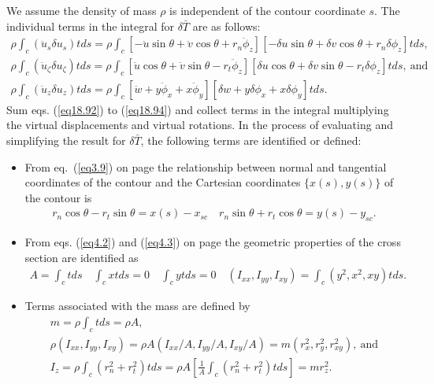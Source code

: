 \documentclass{AeroStructure-ERJohnson}
\begin{document}
We assume the density of mass $\rho$ is independent of the contour coordinate $s$. The individual terms in the integral for $\delta \bar{T}$ are as follows:
\begin{gather}\label{eq18.92}
\rho \int_{c}\left(\ddot{u}_{s} \delta u_{s}\right) t d s=\rho \int_{c}\left[-\ddot{u} \sin \theta+\ddot{v} \cos \theta+r_{n} \ddot{\phi}_{z}\right]\left[-\delta u \sin \theta+\delta v \cos \theta+r_{n} \delta \phi_{z}\right] t d s,
\\\label{eq18.93}
\rho \int_{c}\left(\ddot{u}_{\zeta} \delta u_{\zeta}\right) t d s=\rho \int_{c}\left[\ddot{u} \cos \theta+\ddot{v} \sin \theta-r_{t} \ddot{\phi}_{z}\right]\left[\delta u \cos \theta+\delta v \sin \theta-r_{t} \delta \phi_{z}\right] t d s,\ \text{and}
\\\label{eq18.94}
\rho \int_{c}\left(\ddot{u}_{z} \delta u_{z}\right) t d s=\rho \int_{c}\left[\ddot{w}+y \ddot{\phi}_{x}+x \ddot{\phi}_{y}\right]\left[\delta w+y \delta \phi_{x}+x \delta \phi_{y}\right] t d s.
\end{gather}
Sum eqs. (\ref{eq18.92}) to (\ref{eq18.94}) and collect terms in the integral multiplying the virtual displacements and virtual rotations. In the process of evaluating and simplifying the result for $\delta \bar{T}$, the following terms are identified or defined:
\begin{itemize}
  \item From eq.~(\ref{eq3.9}) on page \pageref{eq3.9} the relationship between normal and tangential coordinates of the contour and the Cartesian coordinates $\{x(s), y(s)\}$ of the contour is
  \begin{align}\label{eq18.95}
r_{n} \cos \theta-r_{t} \sin \theta=x(s)-x_{s c} \quad r_{n} \sin \theta+r_{t} \cos \theta=y(s)-y_{s c}.
\end{align}
  \item From eqs. (\ref{eq4.2}) and (\ref{eq4.3}) on page \pageref{eq4.3} the geometric properties of the cross section are identified as
\begin{align}\label{eq18.96}
A=\int_{c} t d s \quad \int_{c} x t d s=0 \quad \int_{c} y t d s=0 \quad\left(I_{x x}, I_{y y}, I_{x y}\right)=\int_{c}\left(y^{2}, x^{2}, x y\right) t d s.
\end{align}
  \item Terms associated with the mass are defined by
\begin{gather}\label{eq18.97}
m=\rho \int_{c} t d s=\rho A,
\\
\rho\left(I_{x x}, I_{y y}, I_{x y}\right)=\rho A\left(I_{x x}/A, I_{y y}/A, I_{x y}/A\right)=m\left(r_{x}^{2}, r_{y}^{2}, r_{x y}^{2}\right),\ \text{and}\label{eq18.98}\\
I_{z}=\rho \int_{c}\left(r_{n}^{2}+r_{t}^{2}\right) t d s=\rho A\left[\frac{1}{A} \int_{c}\left(r_{n}^{2}+r_{t}^{2}\right) t d s\right] = m r_{z}^{2}.\label{eq18.99}
\end{gather}
\end{itemize}
\end{document}
